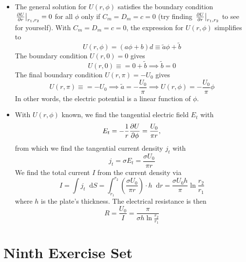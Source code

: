 \documentclass[11pt, a4paper]{article}
\newcommand{\diff}{\mathop{}\!\mathrm{d}} %
\renewcommand{\t}[1]{\tilde{#1}} %
\begin{document}
\begin{itemize}
	\item The general solution for $ U(r, \phi) $ satisfies the boundary condition $ \eval{\pdv{U}{r}}_{r_{1}, r_{2}} = 0 $ for all $ \phi $ only if $ C_{m} = D_{m} = c = 0 $ (try finding $ \eval{\pdv{U}{r}}_{r_{1}, r_{2}}  $ to see for yourself). With $  C_{m} = D_{m} = c = 0 $, the expression for $ U(r, \phi) $ simplifies to
	\begin{equation*}
		U(r, \phi) = (a \phi + b)d \equiv \t{a}\phi + \t{b}
	\end{equation*}
	The boundary condition $ U(r, 0) = 0 $ gives
	\begin{equation*}
		U(r, 0) \equiv = 0 + \t{b} \implies \t{b} = 0
	\end{equation*}
	The final boundary condition $ U(r, \pi) = -U_{0} $ gives
	\begin{equation*}
		U(r, \pi) \equiv = - U_{0} \implies \t{a} = -\frac{U_{0}}{\pi} \implies U(r, \phi) = - \frac{U_{0}}{\pi} \phi
	\end{equation*}
	In other words, the electric potential is a linear function of $ \phi $. 
	
	\item With $ U(r, \phi) $ known, we find the tangential electric field $ E_{t} $ with
	\begin{equation*}
		E_{t} = - \frac{1}{r}\pdv{U}{\phi} = \frac{U_{0}}{\pi r},
	\end{equation*}
	from which we find the tangential current density $ j_{t} $ with
	\begin{equation*}
		j_{t} = \sigma E_{t} = \frac{\sigma U_{0}}{\pi r}
	\end{equation*}
	We find the total current $ I $ from the current density via
	\begin{equation*}
		I = \int j_{t} \diff S = \int_{r_{1}}^{r_{2}} \left(\frac{\sigma U_{0}}{\pi r}\right) \cdot h \diff r = \frac{\sigma U_{0} h}{\pi} \ln \frac{r_{2}}{r_{1}}
	\end{equation*}
	where $ h $ is the plate's thickness. The electrical resistance is then
	\begin{equation*}
		R = \frac{U_{0}}{I} = \frac{\pi}{\sigma h \ln \frac{r_{2}}{r_{1}}}
	\end{equation*}
\end{itemize}

\section{Ninth Exercise Set}
\end{document}
